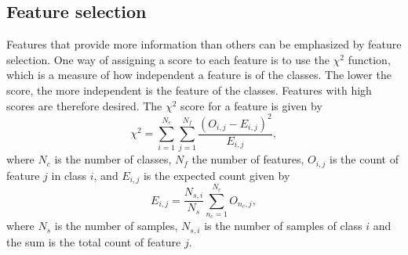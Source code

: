 \subsection{Feature selection}
Features that provide more information than others can be emphasized by feature selection. One way of assigning a score to each feature is to use the $\chi^2$ function, which is a measure of how independent a feature is of the classes. The lower the score, the more independent is the feature of the classes. Features with high scores are therefore desired. The $\chi^2$ score for a feature is given by
\[
\chi^2 = \sum_{i=1}^{N_c} \sum_{j=1}^{N_f} \frac{\left ( O_{i,j} - E_{i,j} \right )^2}{E_{i,j}},
\]
where $N_c$ is the number of classes, $N_f$ the number of features, $O_{i,j}$ is the count of feature $j$ in class $i$, and $E_{i,j}$ is the expected count given by
\[
E_{i,j} = \frac{N_{s,i}}{N_s} \sum_{n_c=1}^{N_c} O_{n_c,j} ,
\]
where $N_s$ is the number of samples, $N_{s,i}$ is the number of samples of class $i$ and the sum is the total count of feature $j$.